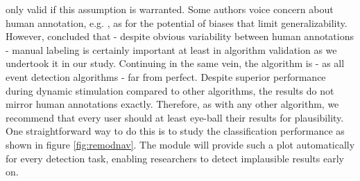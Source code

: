     only valid if this assumption is warranted. Some authors voice concern about human annotation, e.g. \cite{5523936},
    as for the potential of biases that limit generalizability. However, \cite{Hooge2018} concluded that - despite
    obvious variability between human annotations - manual labeling is certainly important at least in algorithm
    validation as we undertook it in our study. Continuing in the same vein, the \remodnav algorithm is - as all event
    detection algorithms - far from perfect. Despite superior performance during dynamic stimulation compared to other
    algorithms, the results do not mirror human annotations exactly. Therefore, as with any other algorithm, we recommend
    that every user should at least eye-ball their results for plausibility. One straightforward way to do this is to
    study the classification performance as shown in figure \ref{fig:remodnav}. The \remodnav module will provide such a
    plot automatically for every detection task, enabling researchers to detect implausible results early on.\\






